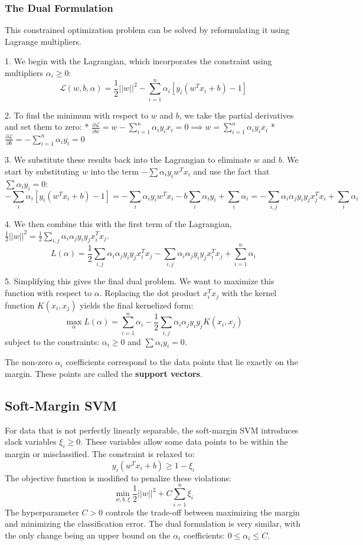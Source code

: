 \documentclass{article}
\begin{document}
\begin{multicols}{2}
\subsubsection{The Dual Formulation}
This constrained optimization problem can be solved by reformulating it using Lagrange multipliers.

1.  We begin with the Lagrangian, which incorporates the constraint using multipliers $\alpha_i \ge 0$:
    $$\mathcal{L}(w, b, \alpha) = \frac{1}{2}||w||^{2} - \sum_{i=1}^{n}\alpha_{i}[y_{i}(w^{T}x_{i} + b) - 1]$$

2.  To find the minimum with respect to $w$ and $b$, we take the partial derivatives and set them to zero:
    * $\frac{\partial \mathcal{L}}{\partial w} = w - \sum_{i=1}^{n}\alpha_{i}y_{i}x_{i} = 0 \implies w = \sum_{i=1}^{n}\alpha_{i}y_{i}x_{i}$ 
    * $\frac{\partial \mathcal{L}}{\partial b} = -\sum_{i=1}^{n}\alpha_{i}y_{i} = 0$ 

3.  We substitute these results back into the Lagrangian to eliminate $w$ and $b$. We start by substituting $w$ into the term $-\sum \alpha_i y_i w^T x_i$ and use the fact that $\sum \alpha_i y_i = 0$:
    $$-\sum_{i}\alpha_{i}[y_{i}(w^{T}x_{i} + b) - 1] = -\sum_{i}\alpha_{i}y_{i}w^{T}x_{i} - b\sum_{i}\alpha_{i}y_{i} + \sum_{i}\alpha_{i} = -\sum_{i,j} \alpha_{i}\alpha_{j}y_{i}y_{j}x_{j}^T x_i + \sum_{i}\alpha_{i}$$
   

4.  We then combine this with the first term of the Lagrangian, $\frac{1}{2}||w||^2 = \frac{1}{2} \sum_{i,j} \alpha_{i}\alpha_{j}y_{i}y_{j}x_{i}^T x_{j}$.
    $$L(\alpha) = \frac{1}{2} \sum_{i,j} \alpha_{i}\alpha_{j}y_{i}y_{j}x_{i}^T x_{j} - \sum_{i,j} \alpha_{i}\alpha_{j}y_{i}y_{j}x_{i}^T x_{j} + \sum_{i=1}^{n} \alpha_i$$
   

5.  Simplifying this gives the final dual problem. We want to maximize this function with respect to $\alpha$. Replacing the dot product $x_i^T x_j$ with the kernel function $K(x_i, x_j)$ yields the final kernelized form:
    $$\max_{\alpha} L(\alpha) = \sum_{i=1}^{n} \alpha_i - \frac{1}{2} \sum_{i,j} \alpha_i \alpha_j y_i y_j K(x_i, x_j)$$
    subject to the constraints: $\alpha_i \ge 0$ and $\sum \alpha_i y_i = 0$.

The non-zero $\alpha_i$ coefficients correspond to the data points that lie exactly on the margin. These points are called the \textbf{support vectors}.

\subsection{Soft-Margin SVM}
For data that is not perfectly linearly separable, the soft-margin SVM introduces slack variables $\xi_i \ge 0$. These variables allow some data points to be within the margin or misclassified. The constraint is relaxed to:
$$ y_i(w^T x_i + b) \ge 1 - \xi_i $$
The objective function is modified to penalize these violations:
$$ \min_{w, b, \xi} \frac{1}{2}||w||^2 + C \sum_{i=1}^{n} \xi_i $$
The hyperparameter $C > 0$ controls the trade-off between maximizing the margin and minimizing the classification error. The dual formulation is very similar, with the only change being an upper bound on the $\alpha_i$ coefficients: $0 \le \alpha_i \le C$.


\end{multicols}
\end{document}
